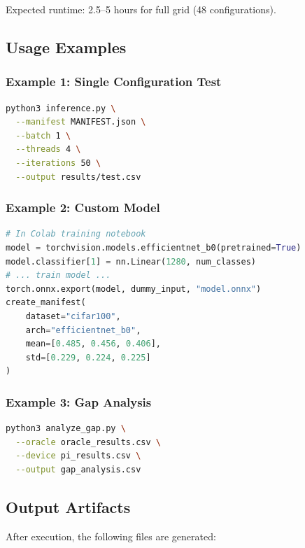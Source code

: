 \documentclass[review]{elsarticle}
\begin{document}
Expected runtime: 2.5--5 hours for full grid (48 configurations).

\subsection{Usage Examples}

\subsubsection{Example 1: Single Configuration Test}

\begin{lstlisting}[language=bash]
python3 inference.py \
  --manifest MANIFEST.json \
  --batch 1 \
  --threads 4 \
  --iterations 50 \
  --output results/test.csv
\end{lstlisting}

\subsubsection{Example 2: Custom Model}

\begin{lstlisting}[language=Python]
# In Colab training notebook
model = torchvision.models.efficientnet_b0(pretrained=True)
model.classifier[1] = nn.Linear(1280, num_classes)
# ... train model ...
torch.onnx.export(model, dummy_input, "model.onnx")
create_manifest(
    dataset="cifar100",
    arch="efficientnet_b0",
    mean=[0.485, 0.456, 0.406],
    std=[0.229, 0.224, 0.225]
)
\end{lstlisting}

\subsubsection{Example 3: Gap Analysis}

\begin{lstlisting}[language=bash]
python3 analyze_gap.py \
  --oracle oracle_results.csv \
  --device pi_results.csv \
  --output gap_analysis.csv
\end{lstlisting}

\subsection{Output Artifacts}

After execution, the following files are generated:
\end{document}
